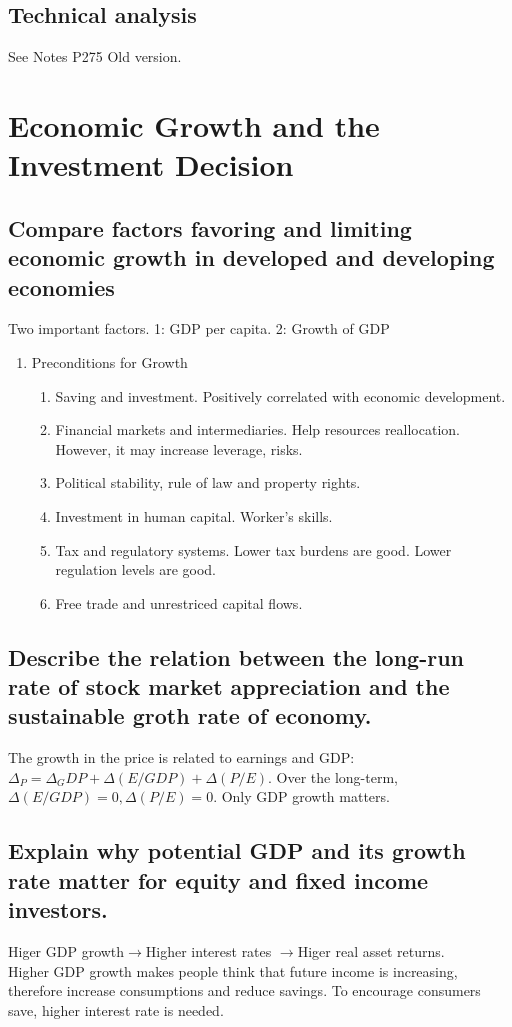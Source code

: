 \documentclass{article}
\newcommand{\be}{\begin{enumerate}}
\newcommand{\ee}{\end{enumerate}}
\newcommand{\ra}{$\rightarrow$}
\begin{document}
\subsection{Technical analysis}
See Notes P275 Old version.


\section{Economic Growth and the Investment Decision}
\subsection{Compare factors favoring and limiting economic growth in developed and developing economies}
Two important factors. 1: GDP per capita. 2: Growth of GDP
\be
    \item Preconditions for Growth
        \be
            \item Saving and investment. Positively correlated with economic development.
            \item Financial markets and intermediaries. Help resources reallocation. 
                However, it may increase leverage, risks.
            \item Political stability, rule of law and property rights.
            \item Investment in human capital. Worker's skills.
            \item Tax and regulatory systems. Lower tax burdens are good.
                Lower regulation levels are good.
            \item Free trade and unrestriced capital flows.
        \ee
\ee
\subsection{Describe the relation between the long-run rate of stock market appreciation and
the sustainable groth rate of economy.}
The growth in the price is related to earnings and GDP: 
$\Delta_P=\Delta_GDP + \Delta(E/GDP)+\Delta(P/E)$.
Over the long-term, $\Delta(E/GDP)=0,\Delta(P/E)=0$. Only GDP growth matters.
\subsection{Explain why potential GDP and its growth rate matter for equity and fixed income investors.}
Higer GDP growth\ra Higher interest rates \ra Higer real asset returns.\\
Higher GDP growth makes people think that future income is increasing, therefore increase consumptions
and reduce savings. To encourage consumers save, higher interest rate is needed.
\end{document}
